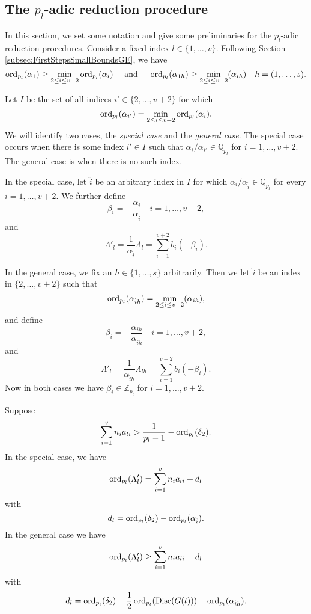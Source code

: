 
\subsection{The $p_l$-adic reduction procedure}

In this section, we set some notation and give some preliminaries for the $p_l$-adic reduction procedures. Consider a fixed index $l \in \{1, \dots, v\}$. Following Section \ref{subsec:FirstStepsSmallBoundsGE}, we have
\[\operatorname{ord}_{p_l}(\alpha_1) \geq \min_{2\leq i\leq v+2} \operatorname{ord}_{p_l}(\alpha_i) \quad \text{ and } \quad \operatorname{ord}_{p_l}(\alpha_{1h}) \geq \min_{2\leq i\leq v+2}(\alpha_{ih}) \quad h = (1, \dots, s).\]

Let $I$ be the set of all indices $i' \in \{2, \dots, v+2\}$ for which
\[\operatorname{ord}_{p_l}(\alpha_{i'}) = \min_{2\leq i\leq v+2} \operatorname{ord}_{p_l}(\alpha_i).\]
We will identify two cases, the \textit{special case} and the \textit{general case}. The special case occurs when there is some index $i' \in I$ such that $\alpha_i/\alpha_{i'} \in \mathbb{Q}_{p_l}$ for $i = 1, \dots, v+2$. The general case is when there is no such index. 

In the special case, let $\hat{i}$ be an arbitrary index in $I$ for which $\alpha_i/\alpha_{\hat{i}} \in \mathbb{Q}_{p_l}$ for every $i = 1, \dots, v+2$. We further define
\[\beta_i = - \frac{\alpha_i}{\alpha_{\hat{i}}} \quad i = 1, \dots, v+2,\]
and 
\[\Lambda'_l = \frac{1}{\alpha_{\hat{i}}}\Lambda_l = \sum_{i = 1}^{v+2} b_i(-\beta_i).\]

In the general case, we fix an $h \in \{1, \dots, s\}$ arbitrarily. Then we let $\hat{i}$ be an index in $\{2, \dots, v+2\}$ such that 
\[ \operatorname{ord}_{p_l}(\alpha_{\hat{i}h}) = \min_{2\leq i\leq v+2}(\alpha_{ih}),\]
and define
\[\beta_i = - \frac{\alpha_{ih}}{\alpha_{\hat{i}h}} \quad i = 1, \dots, v+2,\]
and 
\[\Lambda'_l = \frac{1}{\alpha_{\hat{i}h}}\Lambda_{lh} = \sum_{i = 1}^{v+2} b_i(-\beta_i).\]
Now in both cases we have $\beta_i \in \mathbb{Z}_{p_l}$ for $i = 1, \dots, v+2$. 

\begin{lemma} \label{Lem:19.1}
Suppose
\[\sum_{i = 1}^v n_{i}a_{li} > \frac{1}{p_l-1} - \operatorname{ord}_{p_l}(\delta_2).\]
In the special case, we have 
\[\operatorname{ord}_{p_l}(\Lambda_l') = \sum_{i = 1}^v n_{i}a_{li} + d_l\]
with
\[d_l = \operatorname{ord}_{p_l}(\delta_2) - \operatorname{ord}_{p_l}(\alpha_{\hat{i}}).\]
In the general case we have
\[\operatorname{ord}_{p_l}(\Lambda_{l}') \geq \sum_{i = 1}^v n_{i}a_{li} + d_l\]
with 
\[d_l = \operatorname{ord}_{p_l}(\delta_2) - \frac{1}{2}\operatorname{ord}_{p_l}(\text{Disc}(G(t))) - \operatorname{ord}_{p_l}(\alpha_{\hat{i}h}).\]
\end{lemma}

